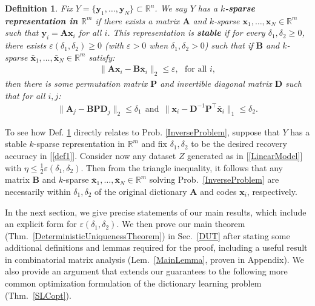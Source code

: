 \documentclass[9pt,twocolumn]{pnas-new}
\newtheorem{definition}{Definition}
\renewcommand{\eqref}[1]{\textnormal{[\ref{#1}]}}
\begin{document}
\begin{definition}\label{maindef}
Fix $Y = \{ \mathbf{y}_1, \ldots, \mathbf{y}_N\} \subset \mathbb{R}^n$. We say $Y$ has a \textbf{$k$-sparse representation in $\mathbb{R}^m$} if there exists a matrix $\mathbf{A}$ and $k$-sparse $\mathbf{x}_1, \ldots, \mathbf{x}_N \in \mathbb{R}^m$ such that $\mathbf{y}_i = \mathbf{A}\mathbf{x}_i$ for all $i$. 
This representation is \textbf{stable} if for every $\delta_1, \delta_2 \geq 0$, there exists $\varepsilon(\delta_1, \delta_2) \geq 0$ (with $\varepsilon > 0$ when  $\delta_1, \delta_2 > 0$) such that if $\mathbf{B}$ and $k$-sparse $\mathbf{\bar x}_1, \ldots, \mathbf{\bar x}_N \in \mathbb{R}^m$ satisfy:
\begin{align*}
\|\mathbf{A}\mathbf{x}_i - \mathbf{B}\mathbf{\bar x}_i\|_2 \leq \varepsilon,\ \ \   \text{for all $i$},
\end{align*}
then there is some permutation matrix $\mathbf{P}$ and invertible diagonal matrix $\mathbf{D}$ such that for all $i, j$:
\begin{align}\label{def1}
\|\mathbf{A}_j - \mathbf{BPD}_j\|_2 \leq \delta_1 \ \ \text{and} \ \ \|\mathbf{x}_i - \mathbf{D}^{-1}\mathbf{P}^{\top}\mathbf{\bar x}_i\|_1 \leq \delta_2.
\end{align}
\end{definition}

\pagebreak

To see how Def. \ref{maindef} directly relates to Prob. \ref{InverseProblem}, suppose that $Y$ has a stable $k$-sparse representation in $\mathbb{R}^m$ and fix $\delta_1, \delta_2$ to be the desired recovery accuracy in \eqref{def1}. Consider now any dataset $Z$ generated as in \eqref{LinearModel} with $\eta \leq \frac{1}{2} \varepsilon(\delta_1, \delta_2)$. Then from the triangle inequality, it follows that any matrix $\mathbf{B}$ and $k$-sparse $\mathbf{\bar x}_1, \ldots, \mathbf{\bar x}_N \in \mathbb{R}^m$ solving Prob.~\ref{InverseProblem} are necessarily within $\delta_1, \delta_2$ of the original dictionary $\mathbf{A}$ and codes $\mathbf{x}_i$, respectively.

In the next section, we give precise statements of our main results, which include an explicit form for $\varepsilon(\delta_1, \delta_2)$. We then prove our main theorem (Thm.~\ref{DeterministicUniquenessTheorem}) in Sec.~\ref{DUT} after stating some additional definitions and lemmas required for the proof, including a useful result in combinatorial matrix analysis (Lem.~\ref{MainLemma}, proven in Appendix). We also provide an argument that extends our guarantees to the following more common optimization formulation of the dictionary learning problem (Thm.~\ref{SLCopt}).
\end{document}

